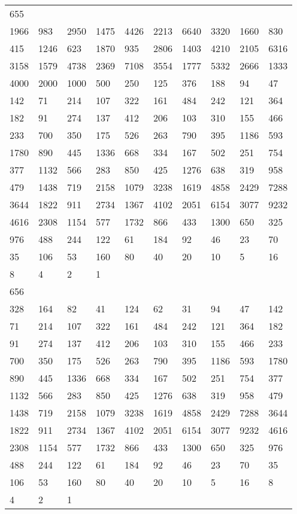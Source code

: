\begin{longtable}{*{10}{l}}
655&&&&&&&&&\\
1966& 983& 2950& 1475& 4426& 2213& 6640& 3320& 1660& 830\\
415& 1246& 623& 1870& 935& 2806& 1403& 4210& 2105& 6316\\
3158& 1579& 4738& 2369& 7108& 3554& 1777& 5332& 2666& 1333\\
4000& 2000& 1000& 500& 250& 125& 376& 188& 94& 47\\
142& 71& 214& 107& 322& 161& 484& 242& 121& 364\\
182& 91& 274& 137& 412& 206& 103& 310& 155& 466\\
233& 700& 350& 175& 526& 263& 790& 395& 1186& 593\\
1780& 890& 445& 1336& 668& 334& 167& 502& 251& 754\\
377& 1132& 566& 283& 850& 425& 1276& 638& 319& 958\\
479& 1438& 719& 2158& 1079& 3238& 1619& 4858& 2429& 7288\\
3644& 1822& 911& 2734& 1367& 4102& 2051& 6154& 3077& 9232\\
4616& 2308& 1154& 577& 1732& 866& 433& 1300& 650& 325\\
976& 488& 244& 122& 61& 184& 92& 46& 23& 70\\
35& 106& 53& 160& 80& 40& 20& 10& 5& 16\\
8& 4& 2& 1& \\

656&&&&&&&&&\\
328& 164& 82& 41& 124& 62& 31& 94& 47& 142\\
71& 214& 107& 322& 161& 484& 242& 121& 364& 182\\
91& 274& 137& 412& 206& 103& 310& 155& 466& 233\\
700& 350& 175& 526& 263& 790& 395& 1186& 593& 1780\\
890& 445& 1336& 668& 334& 167& 502& 251& 754& 377\\
1132& 566& 283& 850& 425& 1276& 638& 319& 958& 479\\
1438& 719& 2158& 1079& 3238& 1619& 4858& 2429& 7288& 3644\\
1822& 911& 2734& 1367& 4102& 2051& 6154& 3077& 9232& 4616\\
2308& 1154& 577& 1732& 866& 433& 1300& 650& 325& 976\\
488& 244& 122& 61& 184& 92& 46& 23& 70& 35\\
106& 53& 160& 80& 40& 20& 10& 5& 16& 8\\
4& 2& 1& \\


\end{longtable}
